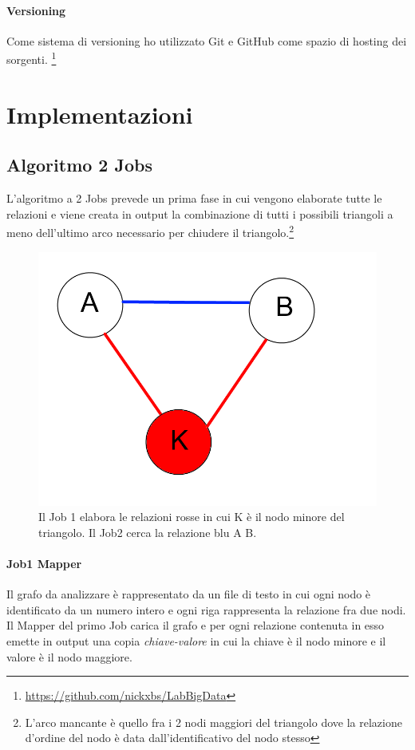 \documentclass[paper=a4, fontsize=11pt]{scrartcl}	%
\numberwithin{equation}{section}															%
\numberwithin{figure}{section}																%
\numberwithin{table}{section}																%
\begin{document}
\paragraph{Versioning}
Come sistema di versioning ho utilizzato Git e GitHub come spazio di hosting dei sorgenti. 
\footnote{\href{https://github.com/nickxbs/LabBigData}{https://github.com/nickxbs/LabBigData}}


\section{Implementazioni}
\subsection{Algoritmo 2 Jobs}
L'algoritmo a 2 Jobs prevede un prima fase in cui vengono elaborate tutte le relazioni e viene creata in output la combinazione di tutti i possibili triangoli a meno dell'ultimo arco necessario per chiudere il triangolo.\footnote{L'arco mancante è quello fra i 2 nodi maggiori del triangolo dove la relazione d'ordine del nodo è data dall'identificativo del nodo stesso} \\


\begin{figure}[h]
\centering
        \includegraphics[totalheight=6cm]{Graph1.png}
    \caption{Il Job 1 elabora le relazioni rosse in cui K è il nodo minore del triangolo. Il Job2 cerca la relazione blu A B.}
    \label{fig:verticalcell} 
\end{figure}
\paragraph{Job1 Mapper}
Il grafo da analizzare è rappresentato da un file di testo in cui ogni nodo è identificato da un numero intero e ogni riga rappresenta la relazione fra due nodi.\\
Il Mapper del primo Job carica il grafo e per ogni relazione contenuta in esso emette in output una copia \textit{chiave-valore} in cui la chiave è il nodo minore e il valore è il nodo maggiore.
\end{document}
